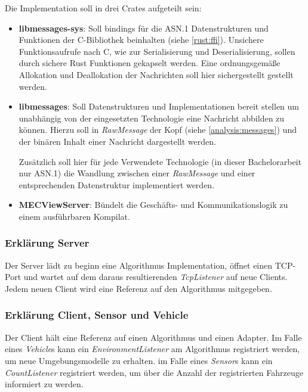 \documentclass[
	12pt,
	table,
	bigheadings,
	ngerman,
	a4paper,
	BCOR5mm,
	DIV14,
	1.1headlines,
	pagesize,
	oneside,
	openright,
	titlepage,
	headsepline,
	nochapterprefix,
	bibtotoc,
	tocindent,
	listsindent,
	pointlessnumbers,
	cleardoubleempty,
	fleqn,
	halfparskip
]{scrbook}
\begin{document}
		Die Implementation soll in drei Crates aufgeteilt sein:
		\begin{itemize}
			\item \textbf{libmessages-sys}: Soll bindings für die ASN.1 Datenstrukturen und Funktionen der C-Bibliothek beinhalten (siehe \autoref{rust:ffi}).
			Unsichere Funktionsaufrufe nach C, wie zur Serialisierung und Deserialisierung, sollen durch sichere Rust Funktionen gekapselt werden.
			Eine ordnungsgemäße Allokation und Deallokation der Nachrichten soll hier sichergestellt gestellt werden.
			
			\item \textbf{libmessages}: Soll Datenstrukturen und Implementationen bereit stellen um unabhängig von der eingesetzten Technologie eine Nachricht abbilden zu können.
			Hierzu soll in \textit{RawMessage} der Kopf (siehe \autoref{analysis:messages}) und der binären Inhalt einer Nachricht dargestellt werden.
			
			Zusätzlich soll hier für jede Verwendete Technologie (in dieser Bachelorarbeit nur ASN.1) die Wandlung zwischen einer \textit{RawMessage} und einer entsprechenden Datenstruktur implementiert werden.
			
			\item \textbf{MECViewServer}: Bündelt die Geschäfts- und Kommunikationslogik zu einem ausführbaren Kompilat.
		\end{itemize}
		
		\subsubsection{Erklärung Server}
		
		Der Server lädt zu beginn eine Algorithmus Implementation, öffnet einen TCP-Port und wartet auf dem daraus resultierenden \textit{TcpListener} auf neue Clients.
		Jedem neuen Client wird eine Referenz auf den Algorithmus mitgegeben.
		
		\subsubsection{Erklärung Client, Sensor und Vehicle}
		
		Der Client hält eine Referenz auf einen Algorithmus und einen Adapter.
		Im Falle eines \textit{Vehicle}s kann ein \textit{EnvironmentListener} am Algorithmus registriert werden, um neue Umgebungsmodelle zu erhalten.
		im Falle eines \textit{Sensor}s kann ein \textit{CountListener} registriert werden, um über die Anzahl der registrierten Fahrzeuge informiert zu werden.
		
\end{document}
